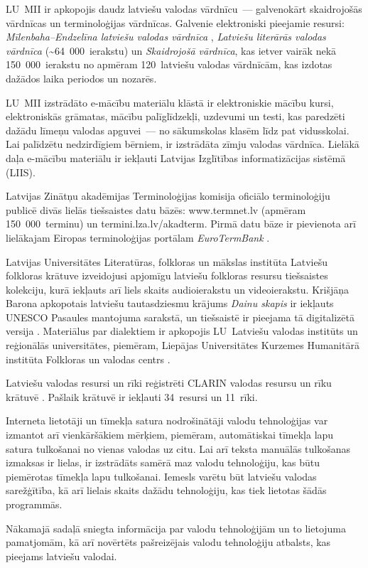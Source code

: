 \begin{multicols}{2}
LU~MII ir apkopojis daudz latviešu valodas vārd\-nīcu~--- galvenokārt skaidrojošās vārdnīcas un terminoloģijas vārdnīcas.
Galvenie elektroniski pieejamie resursi: \textit{Mīlenbaha--Endzelīna latviešu valodas vārdnīca} \cite{Meta10}, \textit{Latviešu literārās valodas vārdnīca} (\~{}64~000~ierakstu) un \textit{Skaidrojošā vārdnīca}, kas ietver vairāk nekā 150~000~ierakstu no apmēram 120~latviešu valodas vārdnīcām, kas izdotas dažādos laika periodos un nozarēs. 

LU~MII izstrādāto e-mācību materiālu klāstā ir elektroniskie mācību kursi, elektroniskās grāmatas, mācību palīglīdzekļi, uzdevumi un testi, kas paredzēti dažādu līmeņu valodas apguvei~--- no sākumskolas klasēm līdz pat vidusskolai.
Lai palīdzētu nedzirdīgiem bērniem, ir izstrādāta zīmju valodas vārdnīca.
Lielākā daļa e-mācību materiālu ir iekļauti Latvijas Izglītības informatizācijas sistēmā (LIIS). 

Latvijas Zinātņu akadēmijas Terminoloģijas komisija oficiālo terminoloģiju publicē divās lielās tiešsaistes datu bāzēs: www.termnet.lv (apmēram 150~000~terminu) un termini.lza.lv/akadterm.
Pirmā datu bāze ir pievienota arī lielākajam Eiropas terminoloģijas portālam \textit{EuroTermBank} \cite{Meta61}.

Latvijas Universitātes Literatūras, folkloras un mākslas institūta Latviešu folkloras krātuve \cite{Meta11} izveidojusi apjomīgu latviešu folkloras resursu tiešsaistes kolekciju, kurā iekļauts arī liels skaits audioierakstu un videoierakstu. 
Krišjāņa Barona apkopotais latviešu tautasdziesmu krājums \textit{Dainu skapis} ir iekļauts UNESCO Pasaules mantojuma sarakstā, un tiešsaistē ir pieejama tā digitalizētā versija \cite{Meta12}. 
Materiālus par dialektiem ir apkopojis LU~Latviešu valodas institūts un reģionālās universitātes, piemēram, Liepājas Universitātes Kurzemes Humanitārā institūta Folkloras un valodas centrs \cite{Meta13}.

Latviešu valodas resursi un rīki reģistrēti CLARIN valodas resursu un rīku krātuvē \cite{Meta14}.
Pašlaik krātuvē ir iekļauti 34~resursi un 11~rīki.

Interneta lietotāji un tīmekļa satura nodrošinātāji valodu tehnoloģijas var izmantot arī vienkāršākiem mērķiem, piemēram, automātiskai tīmekļa lapu satura tulkošanai no vienas valodas uz citu.
Lai arī teksta manuālās tulkošanas izmaksas ir lielas, ir izstrādāts samērā maz valodu tehnoloģiju, kas būtu piemērotas tīmekļa lapu tulkošanai.
Iemesls varētu būt latviešu valodas sarežģītība, kā arī lielais skaits dažādu tehnoloģiju, kas tiek lietotas šādās programmās.

Nākamajā sadaļā sniegta informācija par valodu tehnoloģijām un to lietojuma pamatjomām, kā arī novērtēts pašreizējais valodu tehnoloģiju atbalsts, kas pieejams latviešu valodai. 

\end{multicols}

